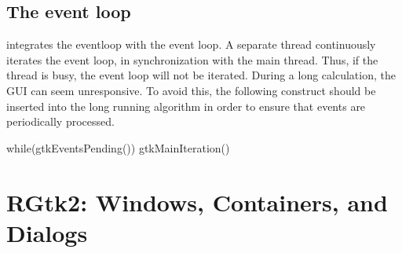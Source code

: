 \section{The event loop}


 integrates the \GTK\/ eventloop with the \R\/ event
loop. A separate thread continuously iterates the \GTK\/ event loop,
in synchronization with the main \R\/ thread.  Thus, if the \R\/
thread is busy, the \GTK\/ event loop will not be iterated. During a
long calculation, the GUI can seem unresponsive. To avoid this, the
following construct should be inserted into the long running algorithm
in order to ensure that \GTK\/ events are periodically processed.

\begin{Schunk}
\begin{Sinput}
 while(gtkEventsPending()) 
   gtkMainIteration()
\end{Sinput}
\end{Schunk}







\chapter{RGtk2: Windows, Containers, and Dialogs}
\label{sec:top-level-windows}

